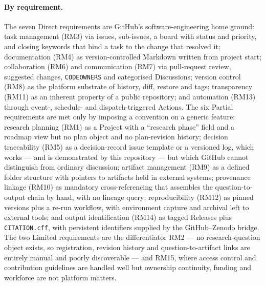 \documentclass[pdflatex,sn-mathphys-num]{sn-jnl}%
\begin{document}
\paragraph{By requirement.} The seven Direct requirements are GitHub's software-engineering home ground: task management (RM3) via issues, sub-issues, a board with status and priority, and closing keywords that bind a task to the change that resolved it; documentation (RM4) as version-controlled Markdown written from project start; collaboration (RM6) and communication (RM7) via pull-request review, suggested changes, \texttt{CODEOWNERS} and categorised Discussions; version control (RM8) as the platform substrate of history, diff, restore and tags; transparency (RM11) as an inherent property of a public repository; and automation (RM13) through event-, schedule- and dispatch-triggered Actions. The six Partial requirements are met only by imposing a convention on a generic feature: research planning (RM1) as a Project with a ``research phase'' field and a roadmap view but no plan object and no plan-revision history; decision traceability (RM5) as a decision-record issue template or a versioned log, which works --- and is demonstrated by this repository --- but which GitHub cannot distinguish from ordinary discussion; artifact management (RM9) as a defined folder structure with pointers to artifacts held in external systems; provenance linkage (RM10) as mandatory cross-referencing that assembles the question-to-output chain by hand, with no lineage query; reproducibility (RM12) as pinned versions plus a re-run workflow, with environment capture and archival left to external tools; and output identification (RM14) as tagged Releases plus \texttt{CITATION.cff}, with persistent identifiers supplied by the GitHub--Zenodo bridge. The two Limited requirements are the differentiator RM2 --- no research-question object exists, so registration, revision history and question-to-artifact links are entirely manual and poorly discoverable --- and RM15, where access control and contribution guidelines are handled well but ownership continuity, funding and workforce are not platform matters.
\end{document}

